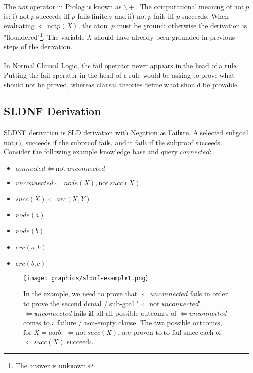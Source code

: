 \documentclass{article}
\theoremstyle{plain}
\theoremstyle{definition}
\begin{document}
\begin{multicols}{2}
\paragraph{} The \textit{not} operator in Prolog is known as $\backslash+$. The computational meaning of $\text{not}\ p$ is: i) $\text{not}\ p$ succeeds iff $p$ fails finitely and ii) $\text{not}\ p$ fails iff $p$ succeeds. When evaluating $\Leftarrow \text{not} p(X)$, the atom $p$ must be ground: otherwise the derivation is "floundered"\footnote{The answer is unknown.}. The variable $X$ should have already been grounded in previous steps of the derivation.

\paragraph{} In Normal Clausal Logic, the fail operator never appears in the head of a rule. Putting the fail operator in the head of a rule would be asking to prove what should not be proved, whereas clausal theories define what should be provable.

\subsection{SLDNF Derivation}
\paragraph{} SLDNF derivation is SLD derivation with Negation as Failure. A selected subgoal $\text{not}\ p)$,  succeeds if the subproof fails, and it fails if the subproof succeeds. Consider the following example knowledge base and query $connected$:

\begin{itemize}
\setlength\itemsep{0.1em}
\item[] $connected \Leftarrow \text{not}\ unconnected$
\item[] $unconnected \Leftarrow node(X), \text{not}\ succ(X)$
\item[] $succ(X) \Leftarrow arc(X, Y)$
\item[] $node(a)$
\item[] $node(b)$
\item[] $arc(a, b)$
\item[] $arc(b, c)$
\end{itemize}

\begin{figure}[H]
\centering
\texttt{[image: graphics/sldnf-example1.png]}
\caption{ In the example, we need to prove that $\Leftarrow unconnected$ fails in order to prove the second denial / sub-goal "$\Leftarrow \text{not}\ unconnected$". $\Leftarrow unconnected$ fails iff all all possible outcomes of $\Leftarrow unconnected$ comes to a failure / non-empty clause. The two possible outcomes, for $X = a \text{or} b$: $\Leftarrow \text{not}\ succ(X)$, are proven to to fail since each of $\Leftarrow succ(X)$ succeeds.}
\end{figure}


\end{multicols}
\end{document}
